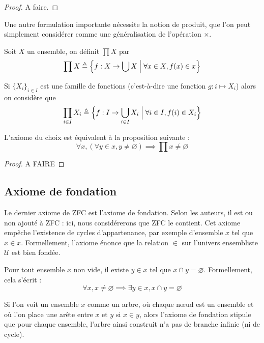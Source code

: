 \begin{proof}
  A faire.
\end{proof}

Une autre formulation importante nécessite la notion de produit, que l'on peut
simplement considérer comme une généralisation de l'opération $\times$.

\begin{definition}
  Soit $X$ un ensemble, on définit $\prod X$ par
  \[\prod X \triangleq \Big\{f : X \to \bigcup X \;\Big|\; \forall x \in X, f(x)\in
  x\Big\}\]

  Si $\{X_i\}_{i\in I}$ est une famille de fonctions (c'est-à-dire une fonction
  $g : i \mapsto X_i$) alors on considère que
  \[\prod_{i\in I} X_i \triangleq \Big\{ f : I \to \bigcup_{i\in I} X_i\;\Big|\;
  \forall i \in I, f(i) \in X_i\Big\}\]
\end{definition}

\begin{proposition}
  L'axiome du choix est équivalent à la proposition suivante :
  \[\forall x, (\forall y \in x, y \neq \varnothing) \implies
  \prod x \neq \varnothing\]
\end{proposition}

\begin{proof}
  A FAIRE
\end{proof}

\subsection{Axiome de fondation}

Le dernier axiome de ZFC est l'axiome de fondation. Selon les auteurs, il est ou
non ajouté à ZFC : ici, nous considérerons que ZFC le contient. Cet axiome
empêche l'existence de cycles d'appartenance, par exemple d'ensemble $x$ tel que
$x\in x$. Formellement, l'axiome énonce que la relation $\in$ sur l'univers
ensembliste $\mathcal U$ est bien fondée.

\begin{axiom}[Fondation]
  Pour tout ensemble $x$ non vide, il existe $y\in x$ tel que
  $x\cap y = \varnothing$. Formellement, cela s'écrit :
  \[\forall x, x\neq\varnothing \implies \exists y \in x, x\cap y = \varnothing\]
\end{axiom}

Si l'on voit un ensemble $x$ comme un arbre, où chaque n\oe ud est un ensemble et
où l'on place une arête entre $x$ et $y$ si $x\in y$, alors l'axiome de fondation
stipule que pour chaque ensemble, l'arbre ainsi construit n'a pas de branche
infinie (ni de cycle).

